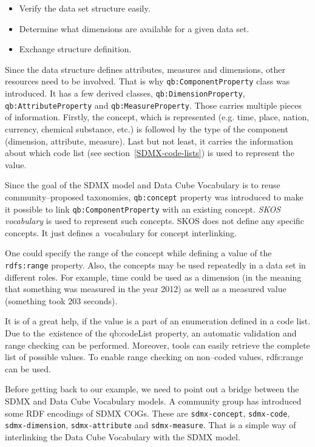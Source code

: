 \begin{itemize}
\item Verify the data set structure easily.
\item Determine what dimensions are available for a given data set.
\item Exchange structure definition.
\end{itemize}

Since the data structure defines attributes, measures and dimensions, other resources need
to be involved. That is why \texttt{qb:ComponentProperty} class was introduced. It has a few derived
classes, \texttt{qb:DimensionProperty}, \texttt{qb:AttributeProperty}
and \texttt{qb:MeasureProperty}. Those carries
multiple pieces of information. Firstly, the concept, which is represented (e.g. time, place,
nation, currency, chemical substance, etc.) is followed by the type of the component
(dimension, attribute, measure). Last but not least, it carries the information about which
code list (see section~\ref{SDMX-code-lists}) is used to represent the value.

Since the goal of the SDMX model and Data Cube Vocabulary is to reuse community--proposed
taxonomies, \texttt{qb:concept} property was introduced to make it possible to link
\texttt{qb:ComponentProperty} with an existing concept. \emph{SKOS vocabulary} is used to
represent such concepts. SKOS does not define any specific concepts. It just defines
a~vocabulary for concept interlinking.

One could specify the range of the concept while defining a value of the \texttt{rdfs:range} property.
Also, the concepts may be used repeatedly in a data set in different roles.
For example, time could be used as a dimension (in the meaning that something was measured
in the year 2012) as well as a measured value (something took 203 seconds).

It is of a great help, if the value is a part of an enumeration defined in a code list. Due to
the~existence of the qb:codeList property, an automatic validation and range checking
can be performed. Moreover, tools can easily retrieve the complete list of possible values.
To enable range checking on non--coded values, rdfs:range can be used.

Before getting back to our example, we need to point out a bridge between the SDMX
and Data Cube Vocabulary models. A community group has introduced some RDF 
encodings of SDMX COGs. These are \texttt{sdmx-concept}, \texttt{sdmx-code}, \texttt{sdmx-dimension},
\texttt{sdmx-attribute} and \texttt{sdmx-measure}. That is a simple way of interlinking the Data Cube
Vocabulary with the SDMX model.

